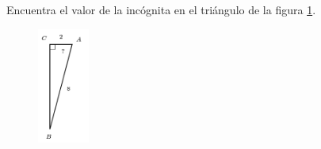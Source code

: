\question[15]  Encuentra el valor de la incógnita en el triángulo de la figura \ref{fig:angle_functrig_20}.
\begin{figure}[H]
    \begin{center}
        \includegraphics[width=0.15\textwidth]{../images/angle_functrig_20.png}
    \end{center}
    \caption{}
    \label{fig:angle_functrig_20}
\end{figure}
